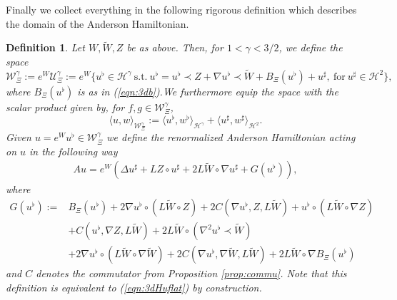 \documentclass[11pt, oneside]{article}   	%
\newcommand{\assign}{:=}
\newtheorem{definition}[theorem]{Definition}
\newcommand{\ssp}{\mathscr{H}}
\begin{document}
Finally we collect everything in the following rigorous definition which describes the domain of the Anderson Hamiltonian.

\begin{definition}
	\label{def:3dham}Let $W, \widetilde{W}, Z$ be as above. Then, for $1 <
	\gamma < 3 / 2$, we define the space
	\[ \mathscr{W}_{\Xi}^{\gamma} \assign e^W \mathscr{U}_{\Xi}^{\gamma} \assign
	e^W \{ u^{\flat} \in \ssp^{\gamma} \ \text{s.t.} \  u^{\flat} =
	u^{\flat} \prec Z + \nabla u^{\flat} \prec \widetilde{W} + B_{\Xi}
	(u^{\flat}) + u^{\sharp}, ~\text{for}~ u^\sharp \in \ssp^2 \}, \]
	where $B_{\Xi} (u^{\flat}) $ is as in (\ref{eqn:3db}).We furthermore equip
	the space with the scalar product given by, for $f, g \in \mathscr{W}_{\Xi}^{\gamma}$,
	\[ \langle u,w
	\rangle_{\mathscr{W}_{\Xi}^{\gamma}} \assign \langle u^{\flat}, w^{\flat}
	\rangle_{\ssp^{\gamma}} + \langle u^{\sharp}, w^{\sharp} \rangle_{\ssp^2} . \]
	Given $u = e^W u^{\flat} \in \mathscr{W}_{\Xi}^{\gamma}$ we
	define the renormalized Anderson Hamiltonian acting on $u$ in the following
	way
	\begin{align}\label{equ:def3dAH}
	 A u = e^W (\Delta u^{\sharp} + L Z \circ u^{\sharp} + 2L \widetilde{W} \circ
	\nabla u^{\sharp} + G (u^{\flat})), 
	\end{align}
	where
	\begin{align*}
	 G (u^{\flat})   \assign &  B_{\Xi} (u^{\flat}) + 2\nabla u^{\flat} \circ (L
	\widetilde{W} \circ Z) + 2C (\nabla u^{\flat}, Z, L \widetilde{W}) + u^{\flat}
	\circ (L \widetilde{W} \circ \nabla Z)
	\\ & + C (u^{\flat}, \nabla Z, L \widetilde{W})
	+ 2L \widetilde{W} \circ (\nabla^2 u^{\flat} \prec \widetilde{W})
	\\& + 2\nabla
	u^{\flat} \circ (L \widetilde{W} \circ \nabla \widetilde{W}) +2 C (\nabla
	u^{\flat}, \nabla \widetilde{W}, L \widetilde{W}) + 2L \widetilde{W} \circ \nabla
	B_{\Xi} (u^{\flat}) 
	\end{align*}
	and $C$ denotes the commutator from Proposition \ref{prop:commu}. Note that
	this definition is equivalent to (\ref{eqn:3dHuflat}) by construction.
\end{definition}
\end{document}
